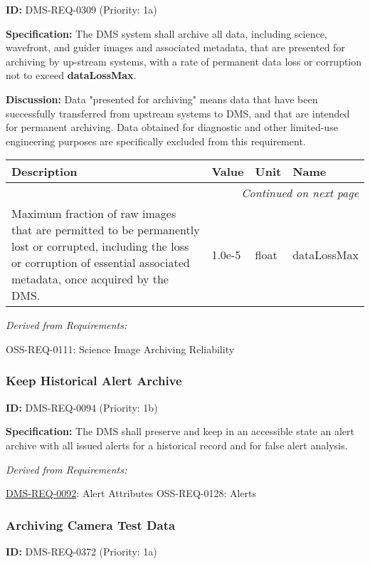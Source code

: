 \documentclass[SE,toc,lsstdraft]{lsstdoc}
\makeatletter
\newcommand{\paramname}[1]{\hspace{0pt}#1}
\newcommand{\unitname}[1]{\hspace{0pt}#1}
\newenvironment{parameters}[0]{%
\setlength\LTleft{0pt}
\setlength\LTright{\fill}
\begin{small}
\begin{longtable}[]{|p{0.49\textwidth}|l|p{0.6in}|p{1.70in}@{}|}

\hline \textbf{Description} & \textbf{Value} & \textbf{Unit} & \textbf{Name} \\ \hline
\endhead

\hline \multicolumn{4}{r}{\emph{Continued on next page}} \\
\endfoot

\hline\hline
\endlastfoot
}{%
\hline
\end{longtable}
\end{small}
}
\makeatother
\begin{document}
\label{DMS-REQ-0309}
\textbf{ID:} DMS-REQ-0309 (Priority: 1a)

\textbf{Specification:}
    The DMS system shall archive all data, including science, wavefront, and guider images and associated metadata, that are presented for archiving by up-stream systems, with a rate of permanent data loss or corruption not to exceed \textbf{dataLossMax}.

\textbf{Discussion:}
Data "presented for archiving" means data that have been successfully transferred from upstream systems to DMS, and that are intended for permanent archiving. Data obtained for diagnostic and other limited-use engineering purposes are specifically excluded from this requirement.

\begin{parameters}
Maximum fraction of raw images that are permitted to be permanently lost or corrupted, including the loss or corruption of essential associated metadata, once acquired by the DMS.
&
1.0e-5
&
\unitname{%
float
}
&
\paramname{%
dataLossMax
} \\\hline
\end{parameters}

\emph{Derived from Requirements:}

OSS-REQ-0111:
Science Image Archiving Reliability \newline

\subsubsection{Keep Historical Alert Archive}

\label{DMS-REQ-0094}
\textbf{ID:} DMS-REQ-0094 (Priority: 1b)

\textbf{Specification: }The DMS shall preserve and keep in an accessible state an alert archive with all issued alerts for a historical record and for false alert analysis.

\emph{Derived from Requirements:}

\hyperref[DMS-REQ-0092]{DMS-REQ-0092}:
Alert Attributes \newline
OSS-REQ-0128:
Alerts \newline

\subsubsection{Archiving Camera Test Data}

\label{DMS-REQ-0372}
\textbf{ID:} DMS-REQ-0372 (Priority: 1a)
\end{document}
